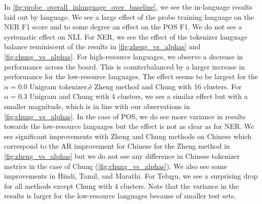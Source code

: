 In \autoref{fig:probe_overall_inlanguage_over_baseline}, we see the in-language results laid out by language. We see a large effect of the probe training language on the NER F1 score and to some degree an effect on the POS F1. We do not see a systematic effect on NLI. For NER, we see the effect of the tokenizer language balance reminiscent of the results in \autoref{fig:zheng_vs_alphas} and \autoref{fig:chung_vs_alphas}. For high-resource languages, we observe a decrease in performance across the board. This is counterbalanced by a larger increase in performance for the low-resource languages. The effect seems to be largest for the $\alpha=0.0$ Unigram tokenizer,ě Zheng method and Chung with 16 clusters. For $\alpha=0.3$ Unigram and Chung with 4 clusters, we see a similar effect but with a smaller magnitude, which is in line with our observations in \autoref{fig:chung_vs_alphas}. In the case of POS, we do see more variance in results towards the low-resource languages but the effect is not as clear as for NER. We see significant improvements with Zheng and Chung methods on Chinese which correspond to the AR improvement for Chinese for the Zheng method in \autoref{fig:zheng_vs_alphas} but we do not see any difference in Chinese tokenizer metrics in the case of Chung (\autoref{fig:chung_vs_alphas}). We also see some improvements in Hindi, Tamil, and Marathi. For Telugu, we see a surprising drop for all methods except Chung with 4 clusters. Note that the variance in the results is larger for the low-resource languages because of smaller test sets.


